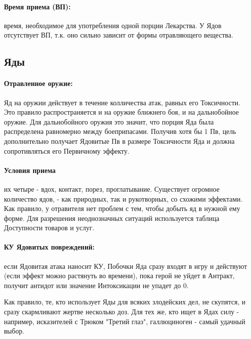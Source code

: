\paragraph{Время приема (ВП):} время, необходимое для употребления одной порции Лекарства. У Ядов отсутствует ВП, т.к. оно сильно зависит от формы отравляющего вещества. 
\printindex[potions]

\subsection{Яды}
\paragraph{Отравленное оружие:} Яд на оружии действует в течение колличества атак, равных его Токсичности. Это правило распространяется и на оружие ближнего боя, и на дальнобойное оружие. Для дальнобойного оружия это значит, что порция Яда была распределена равномерно между боеприпасами. 
\newline Получив хотя бы 1 Пв, цель дополнительно получает Ядовитые Пв в размере Токсичности Яда и должна сопротивляться его Первичному эффекту.
\paragraph{Условия приема} их четыре - вдох, контакт, порез, проглатывание.
\newline Существует огромное количество ядов, - как природных, так и рукотворных, со схожими эффектами. Как правило, у отравителя нет проблем с тем, чтобы добыть яд в нужной ему форме. Для разрешения неоднозначных ситуаций используется таблица Доступности товаров и услуг.
\paragraph{КУ Ядовитых повреждений:} если Ядовитая атака наносит КУ, Побочки Яда сразу входят в игру и действуют (если эффект можно растянуть во времени), пока герой не уйдет в Антракт, получит антидот или значение Интоксикации не упадет до 0.
\printindex[poisons]
\begin{tcolorbox}
    Как правило, те, кто использует Яды для всяких злодейских дел, не скупятся, и сразу скармливают жертве несколько доз.
    \newline Для тех же, кто ищет в Ядах силу - например, исказителей с Трюком "Третий глаз", галлюциноген - самый удачный выбор.
\end{tcolorbox}
